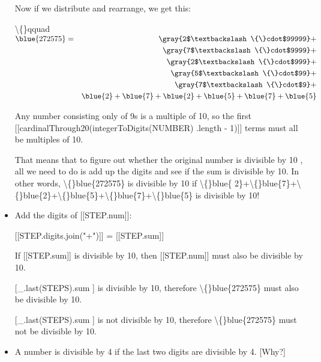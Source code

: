 \documentclass{article}
\begin{document}
\begin{itemize}
                        
                            Now if we distribute and rearrange, we get this:
                        
                        
                            \textbackslash\{\}qquad$\begin{aligned}
                            \blue{272575}=
                            &&\gray{2$\textbackslash\{\}cdot$99999}+ \\&&\gray{7$\textbackslash\{\}cdot$9999}+ \\&&\gray{2$\textbackslash\{\}cdot$999}+ \\&&\gray{5$\textbackslash\{\}cdot$99}+ \\&&\gray{7$\textbackslash\{\}cdot$9}+ \\&&
                            \blue{2}+\blue{7}+\blue{2}+\blue{5}+\blue{7}+\blue{5}
                            \end{aligned}$
                        
                        
                            Any number consisting only of 9s is
                            a multiple of 10, so
                            the first [[cardinalThrough20(integerToDigits(NUMBER)
                            .length - 1)]] terms must all be multiples of
                            10.
                        
                        
                            That means that to figure out whether the original
                            number is divisible by 10
                            , all we need to do is add up the digits
                            and see if the sum is divisible by
                            10. In other words,
                            \textbackslash\{\}blue\{272575\} is divisible
                            by 10 if \textbackslash\{\}blue\{
                            2\}+\textbackslash\{\}blue\{7\}+\textbackslash\{\}blue\{2\}+\textbackslash\{\}blue\{5\}+\textbackslash\{\}blue\{7\}+\textbackslash\{\}blue\{5\} is divisible by
                            10!
  \item Add the digits of [[STEP.num]]:
                    
                        [[STEP.digits.join("+")]] =
                        [[STEP.sum]]
                    
                    
                        If [[STEP.sum]] is
                        divisible by 10, then
                        [[STEP.num]] must also be
                        divisible by 10.
  \item [[\_.last(STEPS).sum]] is divisible
                    by 10, therefore
                    \textbackslash\{\}blue\{272575\}
                    must also be divisible by 10.
  \item [[\_.last(STEPS).sum]] is not divisible
                    by 10, therefore
                    \textbackslash\{\}blue\{272575\}
                    must not be divisible by 10.
  \item A number is divisible by 4 if the last
                        two digits are divisible by 4.
                        [Why?]
                    

\end{itemize}
\end{document}

